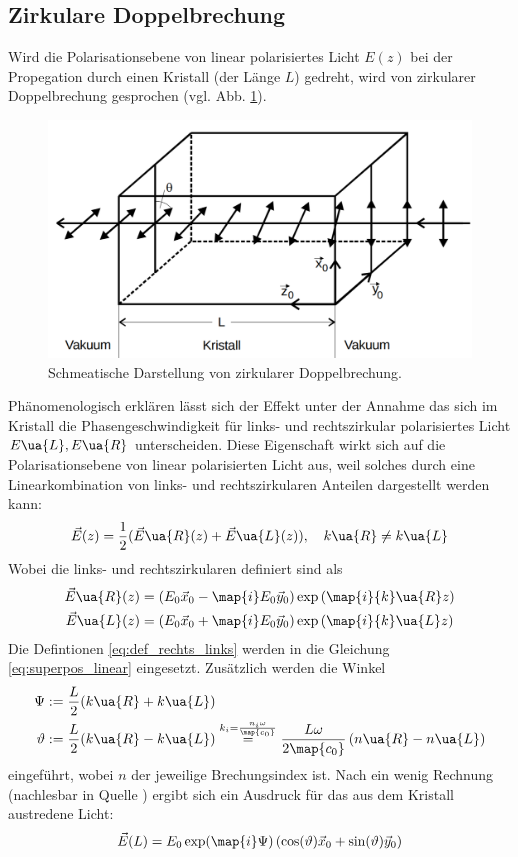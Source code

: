 \subsection{Zirkulare Doppelbrechung}
Wird die Polarisationsebene von linear polarisiertes Licht $E(z)$ bei der Propegation
durch einen Kristall (der Länge $L$) gedreht, wird von zirkularer Doppelbrechung gesprochen (vgl. Abb. \ref{fig:zirkulare_doppelbrechung}).
\begin{figure}
\centering
\includegraphics[width=0.5\linewidth]{./content/images/drehung_polarisationsebene.pdf}
\caption{Schmeatische Darstellung von zirkularer Doppelbrechung\cite{glan_thompson_prisma}.}
\label{fig:zirkulare_doppelbrechung}
\end{figure}
Phänomenologisch erklären lässt sich der Effekt unter der Annahme das sich im
Kristall die Phasengeschwindigkeit für links- und rechtszirkular polarisiertes
Licht $E\ua{L}, E\ua{R}$ unterscheiden. Diese Eigenschaft wirkt sich auf die Polarisationsebene
von linear polarisierten Licht aus, weil solches durch eine Linearkombination
von links- und rechtszirkularen Anteilen dargestellt werden kann:
\begin{equation}
  \label{eq:superpos_linear}
\vec{E}(z) = \frac{1}{2}( \vec{E}\ua{R}(z) + \vec{E}\ua{L}(z)), \quad k\ua{R}\neq k\ua{L}
\end{equation}
Wobei die links- und rechtszirkularen definiert sind als
\begin{align}
  \label{eq:def_rechts_links}
  \begin{aligned}
  \vec{E}\ua{R}(z) &= \left(E_0 \vec{x}_0 - \map{i}E_0\vec{y}_0\right)\exp\left(\map{i}{k}\ua{R}z\right)\\
  \vec{E}\ua{L}(z) &= \left(E_0 \vec{x}_0 + \map{i}E_0\vec{y}_0\right)\exp\left(\map{i}{k}\ua{L}z\right)
\end{aligned}
\end{align}
Die Defintionen \eqref{eq:def_rechts_links} werden in die Gleichung \eqref{eq:superpos_linear}
eingesetzt. Zusätzlich werden die Winkel
\begin{align}
  \label{eq:winkel}
  \begin{aligned}
    \Psi&:=\frac{L}{2}(k\ua{R}+k\ua{L}) \\
    \vartheta &:= \frac{L}{2}(k\ua{R}-k\ua{L}) \overset{k_i=\frac{n_i\omega}{\map{c_0}}}{=} \frac{L\omega}{2\map{c_0}}\left(n\ua{R}-n\ua{L}\right)
\end{aligned}
\end{align}
eingeführt, wobei $n$ der jeweilige Brechungsindex ist.
Nach ein wenig Rechnung (nachlesbar in Quelle \cite{anleitungv46}) ergibt sich ein
Ausdruck für das aus dem Kristall austredene Licht:
\begin{equation*}
  \vec{E}(L)=E_0 \exp(\map{i}\Psi)\left(\cos(\vartheta) \vec{x}_0 + \sin(\vartheta)\vec{y}_0\right)
\end{equation*}

